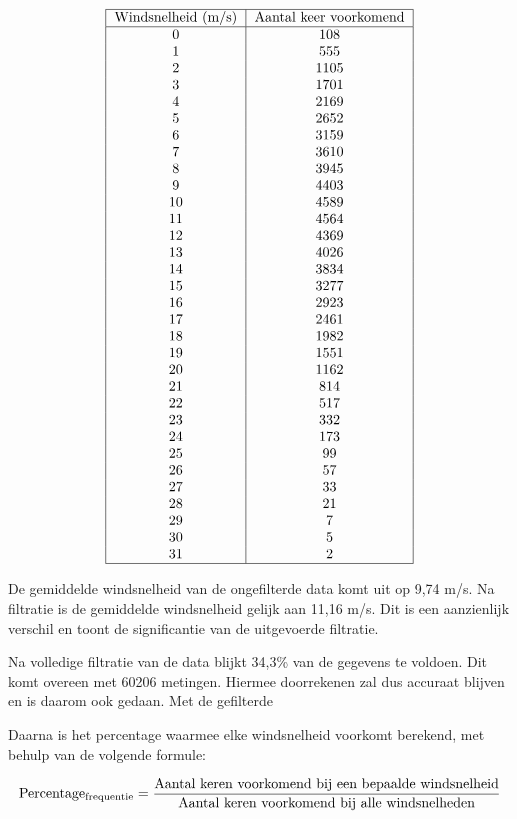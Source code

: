\[
\begin{tabular}{|c|c|}
\hline
Windsnelheid (m/s) & Aantal keer voorkomend \\
\hline
0 & 108 \\
1 & 555 \\
2 & 1105 \\
3 & 1701 \\
4 & 2169 \\
5 & 2652 \\
6 & 3159 \\
7 & 3610 \\
8 & 3945 \\
9 & 4403 \\
10 & 4589 \\
11 & 4564 \\
12 & 4369 \\
13 & 4026 \\
14 & 3834 \\
15 & 3277 \\
16 & 2923 \\
17 & 2461 \\
18 & 1982 \\
19 & 1551 \\
20 & 1162 \\
21 & 814 \\
22 & 517 \\
23 & 332 \\
24 & 173 \\
25 & 99 \\
26 & 57 \\
27 & 33 \\
28 & 21 \\
29 & 7 \\
30 & 5 \\
31 & 2 \\
\hline
\end{tabular}
\]

De gemiddelde windsnelheid van de ongefilterde data komt uit op 9,74 m/s. Na filtratie is de gemiddelde windsnelheid gelijk aan 11,16 m/s. Dit is een aanzienlijk verschil en toont de significantie van de uitgevoerde filtratie.

Na volledige filtratie van de data blijkt 34,3\% van de gegevens te voldoen. Dit komt overeen met 60206 metingen. Hiermee doorrekenen zal dus accuraat blijven en is daarom ook gedaan. Met de gefilterde 

Daarna is het percentage waarmee elke windsnelheid voorkomt berekend, met behulp van de volgende formule:

\[
\text{Percentage\textsubscript{frequentie}} = \frac{\text{Aantal keren voorkomend bij een bepaalde windsnelheid}}{\text{Aantal keren voorkomend bij alle windsnelheden}}
\]

